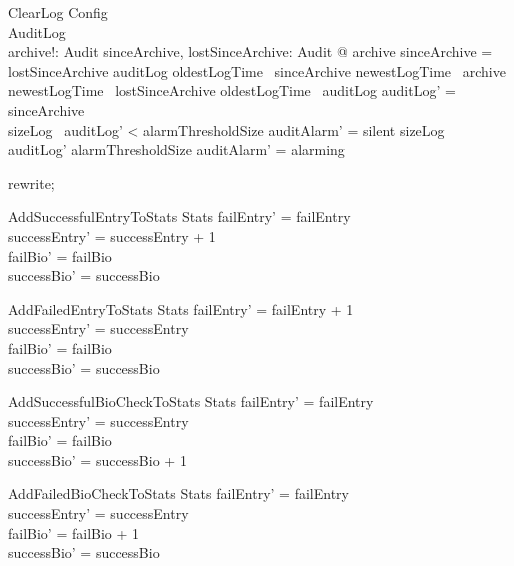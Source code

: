 \begin{schema}{ClearLog}
  Config\\
  \Delta AuditLog\\
  archive!: \finset  Audit
\where
  \exists  sinceArchive, lostSinceArchive: \finset  Audit @ archive \cup  sinceArchive = lostSinceArchive \cup  auditLog \land  oldestLogTime~ sinceArchive \geq  newestLogTime~ archive \land  newestLogTime~ lostSinceArchive \leq  oldestLogTime~ auditLog \land  auditLog' = sinceArchive\\
  sizeLog~ auditLog' < alarmThresholdSize \land  auditAlarm' = silent \lor  sizeLog~ auditLog' \geq  alarmThresholdSize \land  auditAlarm' = alarming
\end{schema}

\begin{zproof}
rewrite;
\end{zproof}

\begin{schema}{AddSuccessfulEntryToStats}
  \Delta Stats
\where
  failEntry' = failEntry\\
  successEntry' = successEntry + 1\\
  failBio' = failBio\\
  successBio' = successBio
\end{schema}

\begin{schema}{AddFailedEntryToStats}
  \Delta Stats
\where
  failEntry' = failEntry + 1\\
  successEntry' = successEntry\\
  failBio' = failBio\\
  successBio' = successBio
\end{schema}

\begin{schema}{AddSuccessfulBioCheckToStats}
  \Delta Stats
\where
  failEntry' = failEntry\\
  successEntry' = successEntry\\
  failBio' = failBio\\
  successBio' = successBio + 1
\end{schema}

\begin{schema}{AddFailedBioCheckToStats}
  \Delta Stats
\where
  failEntry' = failEntry\\
  successEntry' = successEntry\\
  failBio' = failBio + 1\\
  successBio' = successBio
\end{schema}

